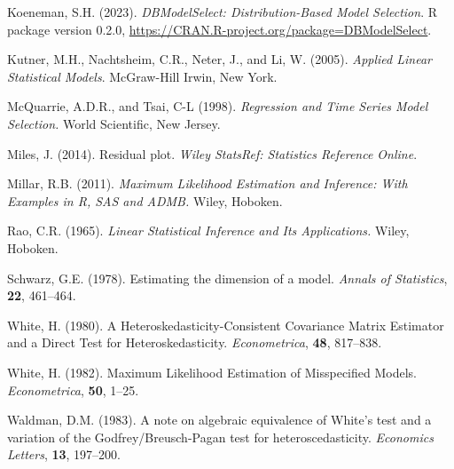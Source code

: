 \documentclass[submit]{smj}
\begin{document}
\begin{thebibliography}{99}
{\rm Koeneman, S.H.} (2023).
\newblock \emph{DBModelSelect: Distribution-Based Model Selection}.
\newblock R package version 0.2.0, \url{https://CRAN.R-project.org/package=DBModelSelect}.

{\rm Kutner, M.H., Nachtsheim, C.R., Neter, J., and Li, W.} (2005).
 \emph{Applied Linear Statistical Models}.
\newblock McGraw-Hill Irwin, New York.

{\rm McQuarrie, A.D.R., and Tsai, C-L} (1998).
 \emph{Regression and Time Series Model Selection.}
\newblock World Scientific, New Jersey.

{\rm Miles, J.} (2014).
\newblock Residual plot.
\newblock \emph{Wiley StatsRef: Statistics Reference Online}.

{\rm Millar, R.B.} (2011).
\newblock \emph{Maximum Likelihood Estimation and Inference: With Examples in R, SAS and ADMB.}
\newblock Wiley, Hoboken.

{\rm Rao, C.R.} (1965).
\newblock \emph{Linear Statistical Inference and Its Applications.}
\newblock Wiley, Hoboken.

{\rm Schwarz, G.E.} (1978).
\newblock Estimating the dimension of a model.
\newblock \emph{Annals of Statistics}, {\bf 22},  461--464.

{\rm White, H.} (1980).
\newblock A Heteroskedasticity-Consistent Covariance Matrix Estimator and a Direct Test for Heteroskedasticity.
\newblock \emph{Econometrica}, {\bf 48},  817--838.

{\rm White, H.} (1982).
\newblock Maximum Likelihood Estimation of Misspecified Models.
\newblock \emph{Econometrica}, {\bf 50},  1--25.

{\rm Waldman, D.M.} (1983).
\newblock A note on algebraic equivalence of White's test and a variation of the Godfrey/Breusch-Pagan test for heteroscedasticity.
\newblock \emph{Economics Letters}, {\bf 13},  197--200.

\end{thebibliography}

\fi
\end{document}
